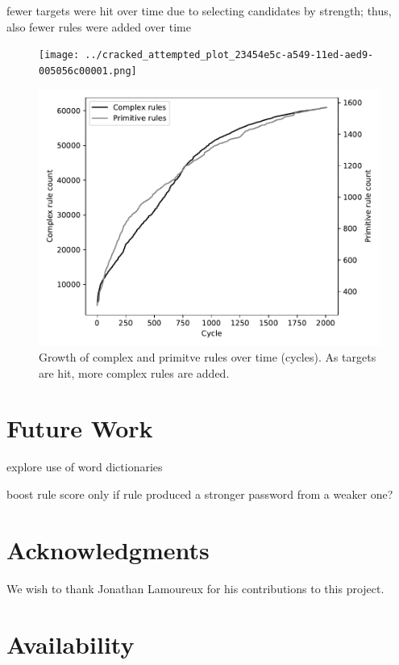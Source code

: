\documentclass[letterpaper,twocolumn,10pt]{article}
\begin{document}
fewer targets were hit over time due to selecting candidates by strength; thus,
also fewer rules were added over time

\begin{figure}
\texttt{[image: ../cracked\_attempted\_plot\_23454e5c-a549-11ed-aed9-005056c00001.png]}
\end{figure}

\begin{figure}
\includegraphics[width=\linewidth]
{analysis/passwords-analysis/stats-rules_composites_size.pdf}
\caption{Growth of complex and primitve rules over time (cycles). As targets
are hit, more complex rules are added. }
\label{fig:rule_count}
\end{figure}

\section{Future Work}

explore use of word dictionaries

boost rule score only if rule produced a stronger password from a weaker one?

\section*{Acknowledgments}

We wish to thank Jonathan Lamoureux for his contributions to this project.

\section*{Availability}
\end{document}

